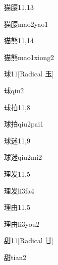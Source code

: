 \begin{entry}{猫腰}{11,13}
  \begin{phonetics}{猫腰}{mao2yao1}
  \end{phonetics}
\end{entry}

\begin{entry}{猫熊}{11,14}
  \begin{phonetics}{猫熊}{mao1xiong2}
  \end{phonetics}
\end{entry}

\begin{entry}{球}{11}[Radical 玉]
  \begin{phonetics}{球}{qiu2}
  \end{phonetics}
\end{entry}

\begin{entry}{球拍}{11,8}
  \begin{phonetics}{球拍}{qiu2pai1}
  \end{phonetics}
\end{entry}

\begin{entry}{球迷}{11,9}
  \begin{phonetics}{球迷}{qiu2mi2}
  \end{phonetics}
\end{entry}

\begin{entry}{理发}{11,5}
  \begin{phonetics}{理发}{li3fa4}
  \end{phonetics}
\end{entry}

\begin{entry}{理由}{11,5}
  \begin{phonetics}{理由}{li3you2}
  \end{phonetics}
\end{entry}

\begin{entry}{甜}{11}[Radical 甘]
  \begin{phonetics}{甜}{tian2}
  \end{phonetics}
\end{entry}


